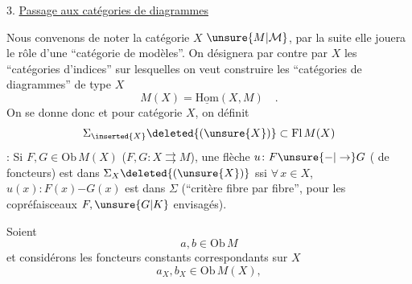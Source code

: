 3. \uline{Passage aux catégories de diagrammes}

Nous  convenons de noter la catégorie $X$
$\unsure{M|\mathcal{M}}$,  par la suite elle jouera le rôle d'une
``catégorie de modèles''. On désignera par contre
par $X$ les ``catégories d'indices'' sur lesquelles
on veut construire les  ``catégories de
diagrammes'' de type $X$
\[
M(X)=\underline{\mathrm{Hom}}(X,M)\quad .
\]
On se donne donc
et pour  catégorie $X$, on définit
\[
\Sigma_{\inserted{X}}\deleted{(\unsure{X})}\subset\mathrm{Fl}\,M(X)
\]
 : Si $F,G\in\mathrm{Ob}\,M(X)$ ($F,G\colon X\rightrightarrows M$),
une flèche $u\colon F\unsure{\mathord{-}|\to}G$ ( de foncteurs)
est dans $\Sigma_X\deleted{(\unsure{X})}$ ssi $\forall\,x\in X$, $u(x)\colon F(x)\mathord{-}G(x)$
est dans $\Sigma$ (``critère  fibre par fibre'', pour
 les copréfaisceaux $F,\unsure{G|K}$ envisagés).

Soient
\[
a,b\in\mathrm{Ob}\,M
\]
et considérons les foncteurs constants correspondants
sur $X$
\[
a_X,b_X\in\mathrm{Ob}\,M(X),
\]
